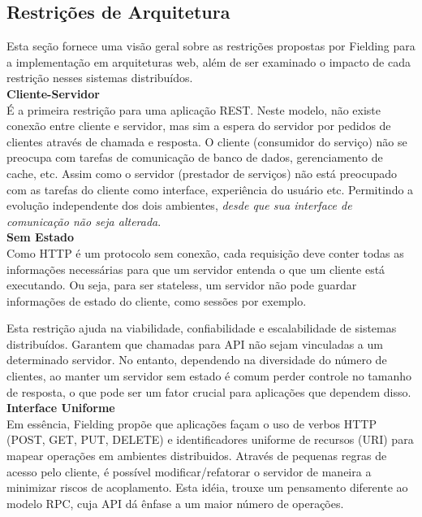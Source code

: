\subsection[Restrições de Arquitetura]{Restrições de Arquitetura}

Esta seção fornece uma visão geral sobre as restrições propostas por Fielding para a implementação em arquiteturas web, além de ser examinado o impacto de cada restrição nesses sistemas distribuídos. \\

\textbf{Cliente-Servidor} \\

É a primeira restrição para uma aplicação REST.  Neste modelo, não existe conexão entre cliente e servidor, mas sim a espera do servidor por pedidos de clientes através de chamada e resposta. O cliente (consumidor do serviço) não se preocupa com tarefas de comunicação de banco de dados, gerenciamento de cache, etc. Assim como o servidor (prestador de serviços) não está preocupado com as tarefas do cliente como interface, experiência do usuário etc. Permitindo a evolução independente dos dois ambientes, \textit{desde que sua interface de comunicação não seja alterada}. \cite{Fielding2000} \\

\textbf{Sem Estado} \\

Como HTTP é um protocolo sem conexão, cada requisição deve conter todas as informações necessárias para que um servidor entenda o que um cliente está executando. Ou seja, para ser stateless, um servidor não pode guardar informações de estado do cliente, como sessões por exemplo. \cite{Fielding2000}

Esta restrição ajuda na viabilidade, confiabilidade e escalabilidade de sistemas distribuídos. Garantem que chamadas para API não sejam vinculadas a um determinado servidor. No entanto, dependendo na diversidade do número de clientes, ao manter um servidor sem estado é comum perder controle no tamanho de resposta, o que pode ser um fator crucial para aplicações que dependem disso. \cite{Wildermuth2015} \\

\textbf{Interface Uniforme} \\

Em essência, Fielding propõe que aplicações façam o uso de verbos HTTP (POST, GET, PUT, DELETE) e identificadores uniforme de recursos (URI) para mapear operações em ambientes distribuidos. Através de pequenas regras de acesso pelo cliente, é possível modificar/refatorar o servidor de maneira a minimizar riscos de acoplamento. Esta idéia, trouxe um pensamento diferente ao modelo RPC, cuja API dá ênfase a um maior número de operações. \cite{Fielding2000}

